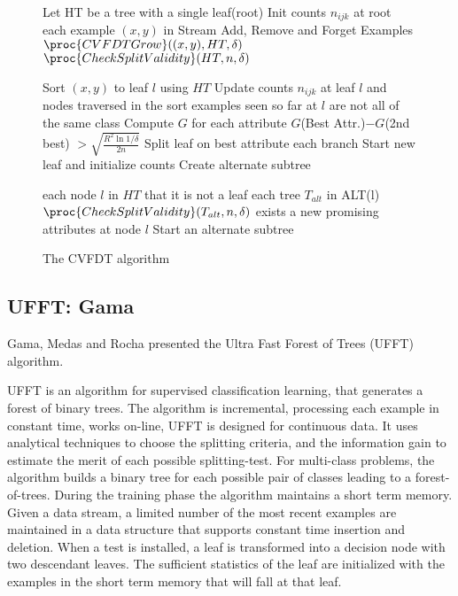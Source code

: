 \begin{figure}
\begin{codebox}
\li  Let HT be a tree with a single leaf(root) 
\li  Init counts $n_{ijk}$ at root
\li \For each example $(x,y)$ in Stream 
\li \Do Add, Remove and Forget Examples
\li $\proc{CVFDTGrow} ((x,y),HT, \delta)$
\li $\proc{CheckSplitValidity} (HT,n, \delta)$ 
\End  \End
\end{codebox}

\begin{codebox}
\li  Sort $(x,y)$ to leaf $l$ using $HT$ 
\li  Update counts $n_{ijk}$ at leaf $l$ and nodes traversed in the sort
\li \If examples seen so far at $l$ are not all of the same class 
\li \Then   Compute $G$ for each attribute
\li \If $G$(Best Attr.)$ - G$(2nd best) $> \sqrt{\frac{R^2\ln 1/\delta}{2n}}$ 
\li \Then  Split leaf on best attribute
\li \For each branch
\li    \Do   Start new leaf and initialize counts
\End  
\li  Create alternate subtree
\End \End
\end{codebox}

\begin{codebox}
\li \For each node $l$ in $HT$ that it is not a leaf
\li \Do \For each tree $T_{alt}$ in ALT(l)
\li \Do $\proc{CheckSplitValidity} (T_{alt},n, \delta)$ 
\End
\li \If exists a new promising attributes at node $l$
\li \Do  Start an alternate subtree
\End
\end{codebox}


\caption{The CVFDT algorithm}
\label{CVFDT}
\end{figure}


\subsection{UFFT: Gama}

Gama, Medas and Rocha \cite {GamaUFFT} presented the Ultra Fast Forest of Trees (UFFT) algorithm.

UFFT  is an algorithm for supervised classification learning, that generates a forest 
of binary trees. The algorithm
is incremental, processing each example in constant
time, works on-line,  UFFT is designed for continuous data. It
uses analytical techniques to choose the splitting criteria,
and the information gain to estimate the merit of each possible
splitting-test. For multi-class problems, the algorithm
builds a binary tree for each possible pair of classes leading
to a forest-of-trees. During the training phase the algorithm
maintains a short term memory. Given a data stream, a
limited number of the most recent examples are maintained
in a data structure that supports constant time insertion
and deletion. When a test is installed, a leaf is transformed
into a decision node with two descendant leaves. The sufficient 
statistics of the leaf are initialized with the examples
in the short term memory that will fall at that leaf. 


